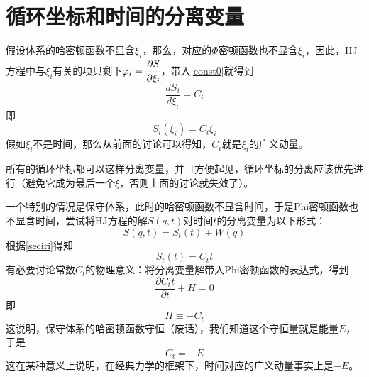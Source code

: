 \documentclass{ctexart}
\begin{document}
\section{循环坐标和时间的分离变量}
假设体系的哈密顿函数不显含$\xi_i$，那么，对应的$\Phi$密顿函数也不显含$\xi_i$，因此，HJ方程中与$\xi_i$有关的项只剩下$\varphi_i = \cfrac{\partial S}{\partial \xi_i}$，带入\cref{const0}就得到
\begin{equation}
\frac{d S_i}{d \xi_i} = C_i
\end{equation}
即
\begin{equation} \label{seciri}
S_i(\xi_i) = C_i \xi_i
\end{equation}
假如$\xi_i$不是时间，那么从前面的讨论可以得知，$C_i$就是$\xi_i$的广义动量。\par
所有的循环坐标都可以这样分离变量，并且方便起见，循环坐标的分离应该优先进行（避免它成为最后一个$\xi$，否则上面的讨论就失效了）。
\par
一个特别的情况是保守体系，此时的哈密顿函数不显含时间，于是Phi密顿函数也不显含时间，尝试将HJ方程的解$S(q,t)$对时间$t$的分离变量为以下形式：
\begin{equation}
S(q,t) = S_t (t)+ W(q)
\end{equation}
根据\cref{seciri}得知
\begin{equation}
S_t(t) = C_t t
\end{equation}
有必要讨论常数$C_t$的物理意义：将分离变量解带入Phi密顿函数的表达式，得到
\begin{equation}
\frac{\partial C_t t}{\partial t} + H = 0
\end{equation}
即
\begin{equation}
 H \equiv -C_t
\end{equation}
这说明，保守体系的哈密顿函数守恒（废话），我们知道这个守恒量就是能量$E$，于是
\begin{equation}
C_t = -E
\end{equation}
这在某种意义上说明，在经典力学的框架下，时间对应的广义动量事实上是$-E$。
\end{document}
